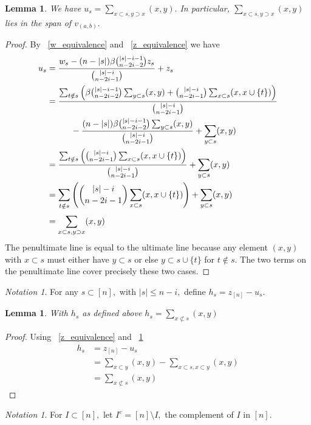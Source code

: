 \documentclass[10 pt]{amsart}
\theoremstyle{plain}
\newtheorem{lem}[thm]{Lemma}
\theoremstyle{definition}
\theoremstyle{remark}
\newtheorem{note}[thm]{Notation}
\numberwithin{equation}{section}
\begin{document}
\begin{lem}
\label{u_equivalence}
We have $u_s = \sum_{x\subset s,y\supset x}^{}(x, y).$ In particular, $\sum_{x\subset s,y\supset x}^{}(x, y)$ lies in the span of $v_{(a, b)}.$
\end{lem}
\begin{proof}
By ~\ref{w_equivalence} and ~\ref{z_equivalence} we have
\begin{align*}
  u_s &= \frac{w_s - (n - |s|)\beta \binom {|s|-i-1}{n-2i-2} z_s}{\binom {|s|-i}{n-2i-1}} + z_s\\
  &= \frac{\sum_{t\notin s}^{} \left(\beta \binom {|s|-i-1}{n-2i-2}\sum_{y \subset s}^{}(x, y) + \binom {|s|-i}{n-2i-1}\sum_{x \subset s}^{}(x, x \cup \{t\}) \right)}{\binom {|s|-i}{n-2i-1}} 
  \\
  & \hspace{1 cm}- \frac{(n - |s|)\beta \binom {|s|-i-1}{n-2i-2} \sum_{y \subset s}^{}(x, y)}{\binom {|s|-i}{n-2i-1}}+ \sum_{y \subset s}^{}(x, y) \\
  &=  \frac{\sum_{t\notin s}^{} \left(\binom {|s|-i}{n-2i-1}\sum_{x \subset s}^{}(x, x \cup \{t\}) \right)}{\binom {|s|-i}{n-2i-1}} + \sum_{y \subset s}^{}(x, y) \\
  &= \sum_{t\notin s}^{} \left(\binom {|s|-i}{n-2i-1}\sum_{x \subset s}^{}(x, x \cup \{t\}) \right) + \sum_{y \subset s}^{}(x, y) \\
  &=  \sum_{x\subset s,y\supset x}^{}(x, y)
\end{align*}
The penultimate line is equal to the ultimate line because any element $(x, y)$ with $x \subset s$ must either have $y \subset s$ or else $y \subset s \cup \{t\}$ for $t \notin s.$ The two terms on the penultimate line cover precisely these two cases.
\end{proof}

\begin{note}
For any $s \subset [n],$ with $|s| \leq n-i,$ define $h_s = z_{[n]} - u_s.$
\end{note}

\begin{lem}
\label{h_equivalence}
With $h_s$ as defined above $h_s = \sum_{x\not\subset s}^{}(x, y)$
\end{lem}
\begin{proof}
Using ~\ref{z_equivalence} and ~\ref{u_equivalence}
\begin{align*}
  h_s &= z_{[n]} - u_s \\
  &= \sum_{x\subset y}^{}(x, y)-\sum_{x\subset s,x\subset y}^{}(x, y)\\
  &= \sum_{x\not\subset s}^{}(x, y)
\end{align*}
\end{proof}
\begin{note}
For $I \subset[n],$ let $I^c = [n]\setminus I,$ the complement of $I$ in $[n].$
\end{note}
\end{document}
